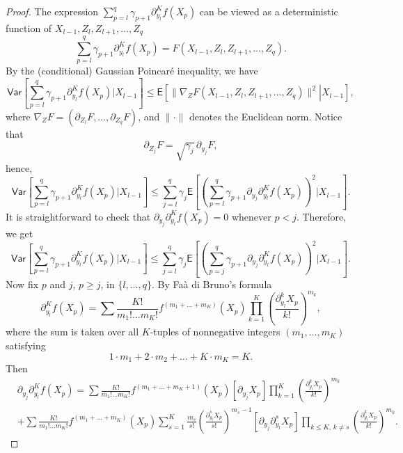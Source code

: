 \documentclass[article]{elsarticle}
\begin{document}
\begin{proof}
The expression
$\sum_{p=l}^q \gamma_{p+1} \partial_{y_l}^K f(X_p)$
can be viewed as a deterministic function of
$X_{l-1},Z_l,Z_{l+1},\ldots,Z_q$
$$
\sum_{p=l}^q \gamma_{p+1} \partial_{y_l}^K f(X_p)
=F(X_{l-1},Z_l,Z_{l+1},\ldots,Z_q).
$$
By the (conditional) Gaussian Poincar\'e inequality,
we have
$$
\mathsf{Var}\left[\sum_{p=l}^{q}\gamma_{p+1}\partial_{y_{l}}^{K}f\left(X_{p}\right)\Big|X_{l-1}\right]
\le\mathsf E\left[\left.
\|\nabla_Z F(X_{l-1},Z_l,Z_{l+1},\ldots,Z_q)\|^2
\right|X_{l-1}\right],
$$
where $\nabla_Z F=(\partial_{Z_l} F,\ldots,\partial_{Z_q} F)$,
and $\|\cdot\|$ denotes the Euclidean norm.
Notice that
$$
\partial_{Z_j} F=\sqrt{\gamma_j}\,\partial_{y_j} F,
$$
hence,
$$
\mathsf{Var}\left[\sum_{p=l}^{q}\gamma_{p+1}\partial_{y_{l}}^{K}f\left(X_{p}\right)\Big|X_{l-1}\right]\leq\sum_{j=l}^{q}\gamma_{j}\mathsf{E}\left[\left(\sum_{p=l}^{q}\gamma_{p+1}\partial_{y_{j}}\partial_{y_{l}}^{K}f\left(X_{p}\right)\right)^{2}\Big|X_{l-1}\right].
$$
It is straightforward to check that
$\partial_{y_j}\partial_{y_l}^K f(X_p)=0$
whenever $p<j$. Therefore, we get
\begin{equation}\label{eq:10062018a2}
\mathsf{Var}\left[\sum_{p=l}^{q}\gamma_{p+1}\partial_{y_{l}}^{K}f\left(X_{p}\right)\Big|X_{l-1}\right]\leq\sum_{j=l}^{q}\gamma_{j}\mathsf{E}\left[\left(\sum_{p=j}^{q}\gamma_{p+1}\partial_{y_{j}}\partial_{y_{l}}^{K}f\left(X_{p}\right)\right)^{2}\Big|X_{l-1}\right].
\end{equation}
Now fix $p$ and $j$, $p\ge j$, in $\{l,\ldots,q\}$.
By Fa\`a di Bruno's formula
\[
\partial_{y_{l}}^{K}f\left(X_{p}\right)=\sum\frac{K!}{m_{1}!\ldots m_{K}!}f^{(m_{1}+\ldots+m_{K})}(X_{p})\prod_{k=1}^{K}\left(\frac{\partial_{y_{l}}^{k}X_{p}}{k!}\right)^{m_{k}},
\]
where the sum is taken over all $K$-tuples of nonnegative integers
$(m_1,\ldots,m_K)$ satisfying
$$
1\cdot m_{1}+2\cdot m_{2}+\ldots+K\cdot m_{K}=K.
$$
Then
\begin{align*}
&\partial_{y_{j}}\partial_{y_{l}}^{K}f\left(X_{p}\right)
=\sum\frac{K!}{m_{1}!\ldots m_{K}!}f^{(m_{1}+\ldots+m_{K}+1)}(X_{p})\left[\partial_{y_{j}}X_{p}\right]\prod_{k=1}^{K}\left(\frac{\partial_{y_{l}}^{k}X_{p}}{k!}\right)^{m_{k}} \\
&+\sum\frac{K!}{m_{1}!\ldots m_{K}!}f^{(m_{1}+\ldots+m_{K})}(X_{p})
\sum_{s=1}^{K}\frac{m_{s}}{s!}
\left(\frac{\partial_{y_{l}}^{s}X_{p}}{s!}\right)^{m_{s}-1}
\left[\partial_{y_{j}}\partial_{y_{l}}^{s}X_{p}\right]
\prod_{k\le K,\,k\neq s}\left(\frac{\partial_{y_{l}}^{k}X_{p}}{k!}\right)^{m_{k}}.
\end{align*}

\end{proof}
\end{document}
